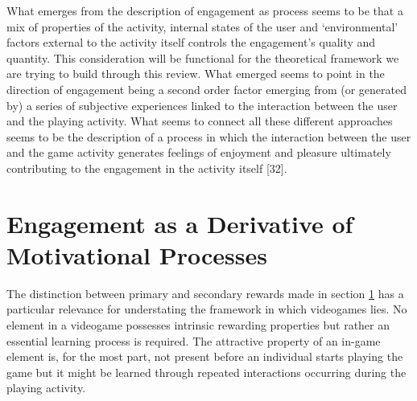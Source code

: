 What emerges from the description of engagement as process seems to be that a mix of properties of the activity, internal states of the user and ‘environmental’ factors external to the activity itself controls the engagement’s quality and quantity. This consideration will be functional for the theoretical framework we are trying to build through this review. What emerged seems to point in the direction of engagement being a second order factor emerging from (or generated by) a series of subjective experiences linked to the interaction between the user and the playing activity. What seems to connect all these different approaches seems to be the description of a process in which the interaction between the user and the game activity generates feelings of enjoyment and pleasure ultimately contributing to the engagement in the activity itself [32].

\section{Engagement as a Derivative of Motivational Processes}

The distinction between primary and secondary rewards made in section \ref{} has a particular relevance for understating the framework in which videogames lies. No element in a videogame possesses intrinsic rewarding properties but rather an essential learning process is required. The attractive property of an in-game element is, for the most part, not present before an individual starts playing the game but it might be learned through repeated interactions occurring during the playing activity.

